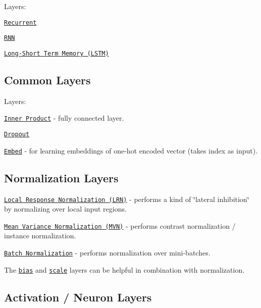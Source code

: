 Layers\+:


\begin{DoxyItemize}
\item \href{layers/recurrent.html}{\tt Recurrent}
\item \href{layers/rnn.html}{\tt R\+NN}
\item \href{layers/lstm.html}{\tt Long-\/\+Short Term Memory (L\+S\+TM)}
\end{DoxyItemize}

\subsection*{Common Layers}

Layers\+:


\begin{DoxyItemize}
\item \href{layers/innerproduct.html}{\tt Inner Product} -\/ fully connected layer.
\item \href{layers/dropout.html}{\tt Dropout}
\item \href{layers/embed.html}{\tt Embed} -\/ for learning embeddings of one-\/hot encoded vector (takes index as input).
\end{DoxyItemize}

\subsection*{Normalization Layers}


\begin{DoxyItemize}
\item \href{layers/lrn.html}{\tt Local Response Normalization (L\+RN)} -\/ performs a kind of \char`\"{}lateral inhibition\char`\"{} by normalizing over local input regions.
\item \href{layers/mvn.html}{\tt Mean Variance Normalization (M\+VN)} -\/ performs contrast normalization / instance normalization.
\item \href{layers/batchnorm.html}{\tt Batch Normalization} -\/ performs normalization over mini-\/batches.
\end{DoxyItemize}

The \href{layers/bias.html}{\tt bias} and \href{layers/scale.html}{\tt scale} layers can be helpful in combination with normalization.

\subsection*{Activation / Neuron Layers}

